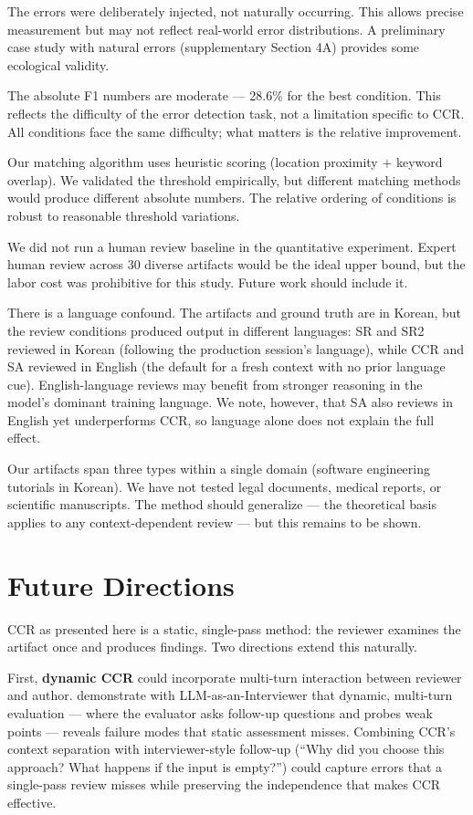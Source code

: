 \documentclass[11pt]{article}
\begin{document}
The errors were deliberately injected, not naturally occurring. This allows precise measurement but may not reflect real-world error distributions. A preliminary case study with natural errors (supplementary Section 4A) provides some ecological validity.

The absolute F1 numbers are moderate --- 28.6\% for the best condition. This reflects the difficulty of the error detection task, not a limitation specific to CCR. All conditions face the same difficulty; what matters is the relative improvement.

Our matching algorithm uses heuristic scoring (location proximity + keyword overlap). We validated the threshold empirically, but different matching methods would produce different absolute numbers. The relative ordering of conditions is robust to reasonable threshold variations.

We did not run a human review baseline in the quantitative experiment. Expert human review across 30 diverse artifacts would be the ideal upper bound, but the labor cost was prohibitive for this study. Future work should include it.

There is a language confound. The artifacts and ground truth are in Korean, but the review conditions produced output in different languages: SR and SR2 reviewed in Korean (following the production session's language), while CCR and SA reviewed in English (the default for a fresh context with no prior language cue). English-language reviews may benefit from stronger reasoning in the model's dominant training language. We note, however, that SA also reviews in English yet underperforms CCR, so language alone does not explain the full effect.

Our artifacts span three types within a single domain (software engineering tutorials in Korean). We have not tested legal documents, medical reports, or scientific manuscripts. The method should generalize --- the theoretical basis applies to any context-dependent review --- but this remains to be shown.

\section{Future Directions}

CCR as presented here is a static, single-pass method: the reviewer examines the artifact once and produces findings. Two directions extend this naturally.

First, \textbf{dynamic CCR} could incorporate multi-turn interaction between reviewer and author. \citet{kim2025interviewer} demonstrate with LLM-as-an-Interviewer that dynamic, multi-turn evaluation --- where the evaluator asks follow-up questions and probes weak points --- reveals failure modes that static assessment misses. Combining CCR's context separation with interviewer-style follow-up (``Why did you choose this approach? What happens if the input is empty?'') could capture errors that a single-pass review misses while preserving the independence that makes CCR effective.
\end{document}
